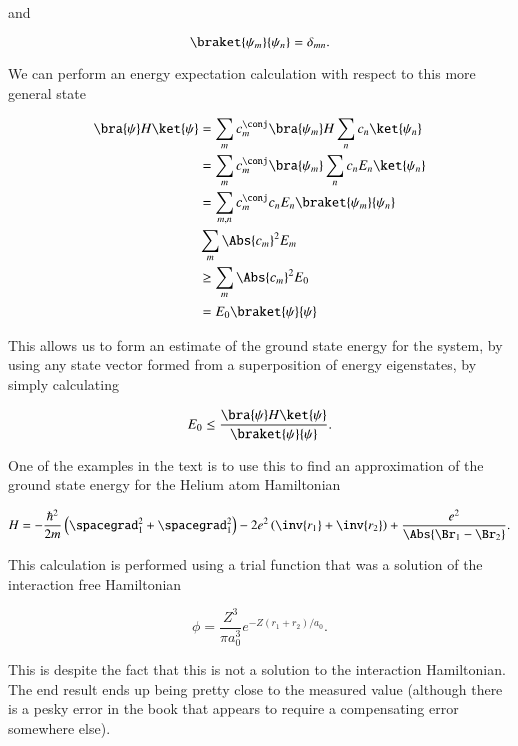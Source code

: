 and

\begin{equation}\label{eqn:variationHarmonicOscillator:50}
\braket{\psi_m}{\psi_n} = \delta_{mn}.
\end{equation}

We can perform an energy expectation calculation with respect to this more general state

\begin{align*}
\bra{\psi} H \ket{\psi} 
&= 
\sum_m c_{m}^\conj \bra{\psi_m} 
H
\sum_n c_{n} \ket{\psi_n} \\
&=
\sum_m c_{m}^\conj \bra{\psi_m}
\sum_n c_{n} E_n \ket{\psi_n} \\
&=
\sum_{m,n} c_{m}^\conj c_n E_n \braket{\psi_m}{\psi_n} \\
&
\sum_{m} \Abs{c_{m}}^2 E_m \\
&\ge
\sum_{m} \Abs{c_{m}}^2 E_0 \\
&=
E_0 \braket{\psi}{\psi}
\end{align*}

This allows us to form an estimate of the ground state energy for the system, by using any state vector formed from a superposition of energy eigenstates, by simply calculating

\begin{equation}\label{eqn:variationHarmonicOscillator:70}
E_0 \le \frac{\bra{\psi} H \ket{\psi}}{ \braket{\psi}{\psi} }.
\end{equation}

One of the examples in the text is to use this to find an approximation of the ground state energy for the Helium atom Hamiltonian

\begin{equation}\label{eqn:variationHarmonicOscillator:90}
H = 
-\frac{\hbar^2}{2m} \left( 
\spacegrad_1^2
+\spacegrad_1^2\right) - 2 e^2 \left( \inv{r_1} + \inv{r_2} \right) + \frac{e^2}{\Abs{\Br_1 - \Br_2}}.
\end{equation}

This calculation is performed using a trial function that was a solution of the interaction free Hamiltonian

\begin{equation}\label{eqn:variationHarmonicOscillator:110}
\phi = \frac{Z^3}{\pi a_0^3} e^{-Z (r_1 + r_2)/a_0 }.
\end{equation}

This is despite the fact that this is not a solution to the interaction Hamiltonian.  The end result ends up being pretty close to the measured value (although there is a pesky error in the book that appears to require a compensating error somewhere else).

